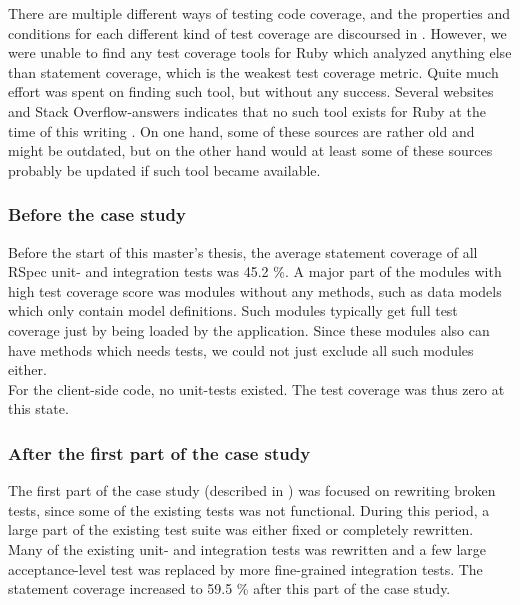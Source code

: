 
There are multiple different ways of testing code coverage, and the
properties and conditions for each different kind of test coverage are
discoursed in . However, we were unable to find any
test coverage tools for Ruby which analyzed anything else than statement
coverage, which is the weakest test coverage metric. Quite much effort
was spent on finding such tool, but without any success. Several
websites and Stack Overflow-answers indicates that no such tool exists
for Ruby at the time of this writing \cite{web:coverage_ruby19,
so:c1c2_coverage, so:c1_coverage, web:toolbox_code_metrics}. On one
hand, some of these sources are rather old and might be outdated, but on
the other hand would at least some of these sources probably be updated
if such tool became available.\\


\subsubsection{Before the case study}

Before the start of this master's thesis, the average statement coverage
of all RSpec unit- and integration tests was 45.2 \%. A major part of
the modules with high test coverage score was modules without any
methods, such as data models which only contain model definitions. Such
modules typically get full test coverage just by being loaded by the
application. Since these modules also can have methods which needs
tests, we could not just exclude all such modules either.\\

For the client-side code, no unit-tests existed. The test coverage was
thus zero at this state.\\


\subsubsection{After the first part of the case study}

The first part of the case study (described in )
was focused on rewriting broken tests, since some of the existing tests
was not functional. During this period, a large part of the existing
test suite was either fixed or completely rewritten. Many of the
existing unit- and integration tests was rewritten and a few large
acceptance-level test was replaced by more fine-grained integration
tests. The statement coverage increased to 59.5 \% after this part of
the case study.


